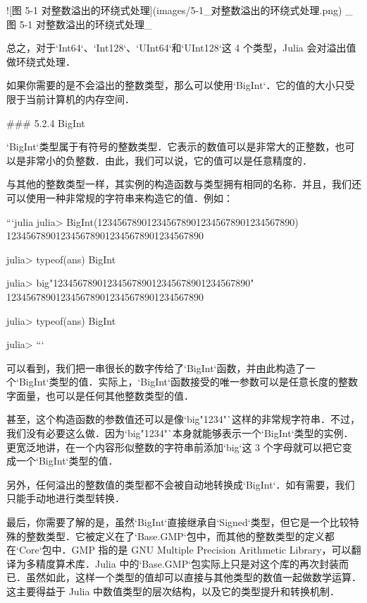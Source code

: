 ![图 5-1 对整数溢出的环绕式处理](images/5-1_对整数溢出的环绕式处理.png)
_图 5-1 对整数溢出的环绕式处理_

总之，对于`Int64`、`Int128`、`UInt64`和`UInt128`这 4 个类型，Julia 会对溢出值做环绕式处理．

如果你需要的是不会溢出的整数类型，那么可以使用`BigInt`．它的值的大小只受限于当前计算机的内存空间．

### 5.2.4 BigInt

`BigInt`类型属于有符号的整数类型．它表示的数值可以是非常大的正整数，也可以是非常小的负整数．由此，我们可以说，它的值可以是任意精度的．

与其他的整数类型一样，其实例的构造函数与类型拥有相同的名称．并且，我们还可以使用一种非常规的字符串来构造它的值．例如：

```julia
julia> BigInt(1234567890123456789012345678901234567890)
1234567890123456789012345678901234567890

julia> typeof(ans)
BigInt

julia> big"1234567890123456789012345678901234567890"
1234567890123456789012345678901234567890

julia> typeof(ans)
BigInt

julia>
```

可以看到，我们把一串很长的数字传给了`BigInt`函数，并由此构造了一个`BigInt`类型的值．实际上，`BigInt`函数接受的唯一参数可以是任意长度的整数字面量，也可以是任何其他整数类型的值．

甚至，这个构造函数的参数值还可以是像`big"1234"`这样的非常规字符串．不过，我们没有必要这么做．因为`big"1234"`本身就能够表示一个`BigInt`类型的实例．更宽泛地讲，在一个内容形似整数的字符串前添加`big`这 3 个字母就可以把它变成一个`BigInt`类型的值．

另外，任何溢出的整数值的类型都不会被自动地转换成`BigInt`．如有需要，我们只能手动地进行类型转换．

最后，你需要了解的是，虽然`BigInt`直接继承自`Signed`类型，但它是一个比较特殊的整数类型．它被定义在了`Base.GMP`包中，而其他的整数类型的定义都在`Core`包中．GMP 指的是 GNU Multiple Precision Arithmetic Library，可以翻译为多精度算术库．Julia 中的`Base.GMP`包实际上只是对这个库的再次封装而已．虽然如此，这样一个类型的值却可以直接与其他类型的数值一起做数学运算．这主要得益于 Julia 中数值类型的层次结构，以及它的类型提升和转换机制．